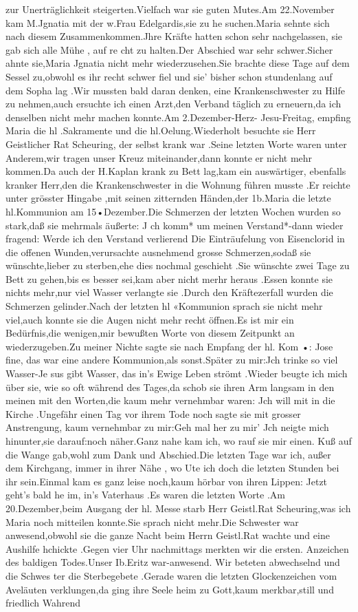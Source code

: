 \documentclass[a4paper,11pt]{article}
\begin{document}
  zur Unerträglichkeit steigerten.Vielfach war sie guten Mutes.Am 22.November kam M.Jgnatia mit der w.Frau Edelgardis,sie zu he suchen.Maria sehnte sich nach diesem Zusammenkommen.Jhre Kräfte hatten schon sehr nachgelassen, sie gab sich alle Mühe , auf re cht zu halten.Der Abschied war sehr schwer.Sicher ahnte sie,Maria Jgnatia nicht mehr wiederzusehen.Sie brachte diese Tage auf dem Sessel zu,obwohl es ihr recht schwer fiel und sie' bisher schon stundenlang auf dem Sopha lag .Wir mussten bald daran denken, eine Krankenschwester zu Hilfe zu nehmen,auch ersuchte ich einen Arzt,den Verband täglich zu erneuern,da ich denselben nicht mehr machen konnte.Am 2.Dezember-Herz- Jesu-Freitag, empfing Maria die hl .Sakramente und die hl.Oelung.Wiederholt besuchte sie Herr Geistlicher Rat Scheuring, der selbst krank war .Seine letzten Worte waren unter Anderem,wir tragen unser Kreuz miteinander,dann konnte er nicht mehr kommen.Da auch der H.Kaplan krank zu Bett lag,kam ein auswärtiger, ebenfalls kranker Herr,den die Krankenschwester in die Wohnung führen musste .Er reichte unter grösster Hingabe ,mit seinen zitternden Händen,der 1b.Maria die letzte hl.Kommunion am 15•Dezember.Die Schmerzen der letzten Wochen wurden so stark,daß sie mehrmals äußerte: J ch komm* um meinen Verstand*-dann wieder fragend: Werde ich den Verstand verlierend Die Einträufelung von Eisenclorid in die offenen Wunden,verursachte ausnehmend grosse Schmerzen,sodaß sie wünschte,lieber zu sterben,ehe dies nochmal geschieht .Sie wünschte zwei Tage zu Bett zu gehen,bis es besser sei,kam aber nicht merhr heraus .Essen konnte sie nichts mehr,nur viel Wasser verlangte sie .Durch den Kräftezerfall wurden die Schmerzen gelinder.Nach der letzten hl «Kommunion sprach sie nicht mehr viel,auch konnte sie die Augen nicht mehr recht öffnen.Es ist mir ein Bedürfnis,die wenigen,mir bewußten Worte von diesem Zeitpunkt an wiederzugeben.Zu meiner Nichte sagte sie nach Empfang der hl. Kom •: Jose fine, das war eine andere Kommunion,als sonst.Später zu mir:Jch trinke so viel Wasser-Je sus gibt Wasser, das in’s Ewige Leben strömt .Wieder beugte ich mich über sie, wie so oft während des Tages,da schob sie ihren Arm langsam in den meinen mit den Worten,die kaum mehr vernehmbar waren: Jch will mit in die Kirche .Ungefähr einen Tag vor ihrem Tode noch sagte sie mit grosser Anstrengung, kaum vernehmbar zu mir:Geh mal her zu mir' Jch neigte mich hinunter,sie darauf:noch näher.Ganz nahe kam ich, wo rauf sie mir einen. Kuß auf die Wange gab,wohl zum Dank und Abschied.Die letzten Tage war ich, außer dem Kirchgang, immer in ihrer Nähe , wo Ute ich doch die letzten Stunden bei ihr sein.Einmal kam es ganz leise noch,kaum hörbar von ihren Lippen: Jetzt geht’s bald he im, in’s Vaterhaus .Es waren die letzten Worte .Am 20.Dezember,beim Ausgang der hl. Messe starb Herr Geistl.Rat Scheuring,was ich Maria noch mitteilen konnte.Sie sprach nicht mehr.Die Schwester war anwesend,obwohl sie die ganze Nacht beim Herrn Geistl.Rat wachte und eine Aushilfe hchickte .Gegen vier Uhr nachmittags merkten wir die ersten. Anzeichen des baldigen Todes.Unser Ib.Eritz war-anwesend. Wir beteten abwechselnd und die Schwes ter die Sterbegebete .Gerade waren die letzten Glockenzeichen vom Aveläuten verklungen,da ging ihre Seele heim zu Gott,kaum merkbar,still und friedlich Wahrend 
\end{document}
